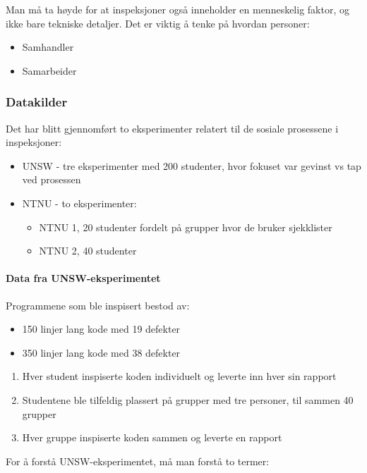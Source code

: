Man må ta høyde for at inspeksjoner også inneholder en menneskelig
faktor, og ikke bare tekniske detaljer. Det er viktig å tenke på hvordan
personer:

\begin{itemize}
\item
  Samhandler
\item
  Samarbeider
\end{itemize}
\subsubsection{Datakilder}

Det har blitt gjennomført to eksperimenter relatert til de sosiale
prosessene i inspeksjoner:

\begin{itemize}
\item
  UNSW - tre eksperimenter med 200 studenter, hvor fokuset var gevinst
  vs tap ved prosessen
\item
  NTNU - to eksperimenter:
  \begin{itemize}
  \item
    NTNU 1, 20 studenter fordelt på grupper hvor de bruker sjekklister
  \item
    NTNU 2, 40 studenter
  \end{itemize}
\end{itemize}
\paragraph{Data fra UNSW-eksperimentet}

Programmene som ble inspisert bestod av:

\begin{itemize}
\item
  150 linjer lang kode med 19 defekter
\item
  350 linjer lang kode med 38 defekter
\end{itemize}
\begin{enumerate}[1.]
\item
  Hver student inspiserte koden individuelt og leverte inn hver sin
  rapport
\item
  Studentene ble tilfeldig plassert på grupper med tre personer, til
  sammen 40 grupper
\item
  Hver gruppe inspiserte koden sammen og leverte en rapport
\end{enumerate}
For å forstå UNSW-eksperimentet, må man forstå to termer:


